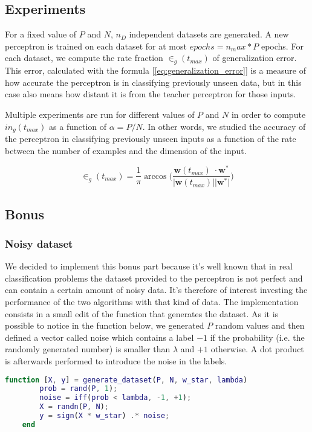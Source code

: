 \subsection{Experiments}
For a fixed value of $P$ and $N$, $n_D$ independent datasets are generated. A new perceptron is trained on each dataset for at most $epochs = n_max * P$ epochs.
For each dataset, we compute the rate fraction $\in_g(t_{max})$ of generalization error. This error, calculated with the formula [\ref{eq:generalization_error}]
is a measure of how accurate the perceptron is in classifying previously unseen data, but in this case also means how distant it is from the teacher perceptron for those inputs.

Multiple experiments are run for different values of $P$ and $N$ in order to compute $in_g(t_{max})$ as a function of $\alpha = P / N$.
In other words, we studied the accuracy of the perceptron in classifying previously unseen inputs as a function of the rate between the number of examples and the dimension of the input.


\begin{equation} \label{eq:generalization_error}
    \in_g(t_{max}) = \frac{1}{\pi} \arccos \bigg(\frac{\mathsf{\bm{w}}(t_{max})\;\cdotp \mathsf{\bm{w}}^*}{\lvert \mathsf{\bm{w}}(t_{max}) \rvert \lvert \mathsf{\bm{w}}^* \rvert} \bigg)
\end{equation}

\subsection{Bonus}
\subsubsection{Noisy dataset}
We decided to implement this bonus part because it's well known that in real classification problems the dataset provided to the perceptron is not perfect and can contain a certain
amount of noisy data. It's therefore of interest investing the performance of the two algorithms with that kind of data. The implementation consists in a small edit of the function
that generates the dataset. As it is possible to notice in the function below, we generated $P$ random values and then defined a vector called noise which contains
a label $-1$ if the probability (i.e. the randomly generated number) is smaller than $\lambda$ and $+1$ otherwise. A dot product is afterwards performed to introduce the noise in
the labels. 

\begin{lstlisting}[language=Matlab]
    function [X, y] = generate_dataset(P, N, w_star, lambda)
        prob = rand(P, 1);
        noise = iff(prob < lambda, -1, +1);
        X = randn(P, N);
        y = sign(X * w_star) .* noise;
    end
\end{lstlisting}